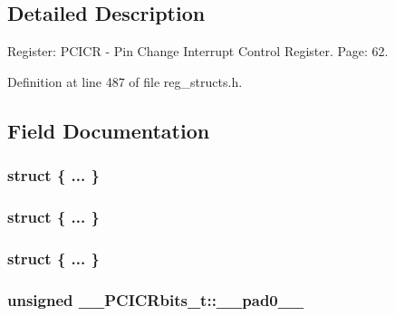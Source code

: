 \subsection{Detailed Description}
Register\+: P\+C\+I\+C\+R -\/ Pin Change Interrupt Control Register. Page\+: 62. 

Definition at line 487 of file reg\+\_\+structs.\+h.



\subsection{Field Documentation}
\hypertarget{union_____p_c_i_c_rbits__t_aee30d2dc4b999326793a32cef5a444d9}{\subsubsection[{"@117}]{\setlength{\rightskip}{0pt plus 5cm}struct \{ ... \} }}\label{union_____p_c_i_c_rbits__t_aee30d2dc4b999326793a32cef5a444d9}
\hypertarget{union_____p_c_i_c_rbits__t_af4eaee594473d8c45cf4d28d7253617d}{\subsubsection[{"@119}]{\setlength{\rightskip}{0pt plus 5cm}struct \{ ... \} }}\label{union_____p_c_i_c_rbits__t_af4eaee594473d8c45cf4d28d7253617d}
\hypertarget{union_____p_c_i_c_rbits__t_a381e7984b241c05abbda31b565e0e92d}{\subsubsection[{"@121}]{\setlength{\rightskip}{0pt plus 5cm}struct \{ ... \} }}\label{union_____p_c_i_c_rbits__t_a381e7984b241c05abbda31b565e0e92d}
\hypertarget{union_____p_c_i_c_rbits__t_a3058fb6c864413e3bdad0d8316cf4156}{
\subsubsection[{\+\_\+\+\_\+pad0\+\_\+\+\_\+}]{\setlength{\rightskip}{0pt plus 5cm}unsigned \+\_\+\+\_\+\+P\+C\+I\+C\+Rbits\+\_\+t\+::\+\_\+\+\_\+pad0\+\_\+\+\_\+}}\label{union_____p_c_i_c_rbits__t_a3058fb6c864413e3bdad0d8316cf4156}


